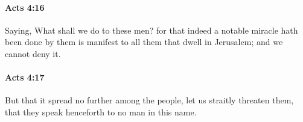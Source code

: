 		\paragraph{Acts 4:16} %
			\label{ACTS-4-16}

			Saying, What shall we do to these men?  for that indeed a notable miracle hath been done by them is manifest to all them that dwell in Jerusalem; and we cannot deny it.

			\begin{framed}
			\scriptsize
				\begin{compactdesc}
					\item[SBLG] 
				\end{compactdesc}
			\end{framed}

		\paragraph{Acts 4:17} %
			\label{ACTS-4-17}

			But that it spread no further among the people, let us straitly threaten them, that they speak henceforth to no man in this name.

